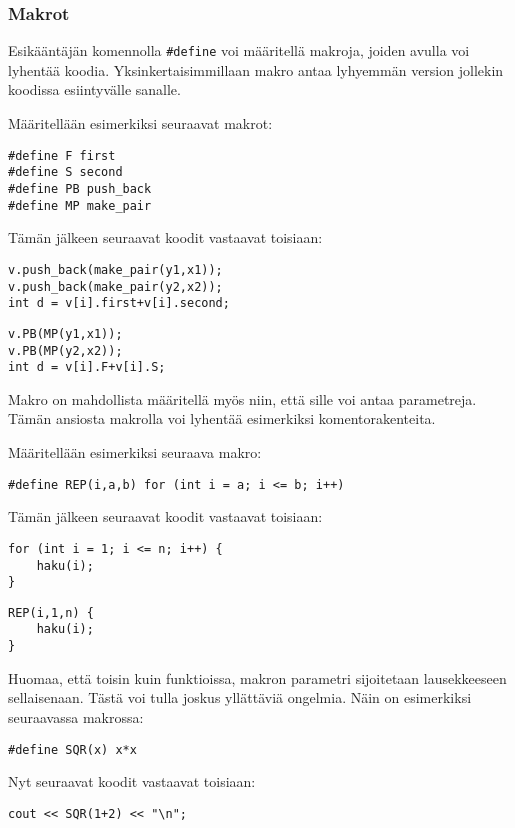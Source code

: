 \subsubsection{Makrot}

Esikääntäjän komennolla \texttt{\#define}
voi määritellä makroja, joiden avulla voi lyhentää
koodia. Yksinkertaisimmillaan makro antaa lyhyemmän
version jollekin koodissa esiintyvälle sanalle.

Määritellään esimerkiksi seuraavat makrot:
\begin{lstlisting}
#define F first
#define S second
#define PB push_back
#define MP make_pair
\end{lstlisting}
Tämän jälkeen seuraavat koodit vastaavat toisiaan:
\begin{lstlisting}
v.push_back(make_pair(y1,x1));
v.push_back(make_pair(y2,x2));
int d = v[i].first+v[i].second;
\end{lstlisting}
\begin{lstlisting}
v.PB(MP(y1,x1));
v.PB(MP(y2,x2));
int d = v[i].F+v[i].S;
\end{lstlisting}
Makro on mahdollista määritellä myös niin,
että sille voi antaa parametreja.
Tämän ansiosta makrolla voi lyhentää esimerkiksi
komentorakenteita.

Määritellään esimerkiksi seuraava makro:
\begin{lstlisting}
#define REP(i,a,b) for (int i = a; i <= b; i++)
\end{lstlisting}
Tämän jälkeen seuraavat koodit vastaavat toisiaan:
\begin{lstlisting}
for (int i = 1; i <= n; i++) {
    haku(i);
}
\end{lstlisting}
\begin{lstlisting}
REP(i,1,n) {
    haku(i);
}
\end{lstlisting}

Huomaa, että toisin kuin funktioissa,
makron parametri sijoitetaan lausekkeeseen
sellaisenaan.
Tästä voi tulla joskus yllättäviä ongelmia.
Näin on esimerkiksi seuraavassa makrossa:

\begin{lstlisting}
#define SQR(x) x*x
\end{lstlisting}

Nyt seuraavat koodit vastaavat toisiaan:

\begin{lstlisting}
cout << SQR(1+2) << "\n";
\end{lstlisting}

